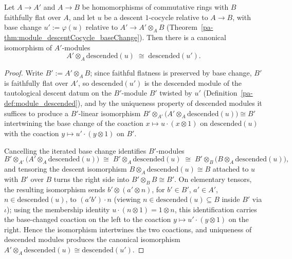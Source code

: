 \begin{theorem}
  \label{pa-thm:module_descendedBaseChangeEquiv}
  \leanok

  Let \(A \to A'\) and \(A \to B\) be homomorphisms of commutative rings with \(B\) faithfully
  flat over \(A\), and let \(u\) be a descent \(1\)-cocycle relative to \(A \to B\), with base
  change \(u' := \varphi(u)\) relative to \(A' \to A' \otimes_A B\)
  (Theorem~\ref{pa-thm:module_descentCocycle_baseChange}). Then there is a canonical isomorphism of
  \(A'\)-modules
  \[
    A' \otimes_A \mathrm{descended}(u) \;\cong\; \mathrm{descended}(u').
  \]
\end{theorem}
\begin{proof}
  \leanok
  Write \(B' := A' \otimes_A B\); since faithful flatness is preserved by base change, \(B'\) is
  faithfully flat over \(A'\), so \(\mathrm{descended}(u')\) is the descended module of the
  tautological descent datum on the \(B'\)-module \(B'\) twisted by \(u'\)
  (Definition~\ref{pa-def:module_descended}), and by the uniqueness property of descended modules
  it suffices to produce a \(B'\)-linear isomorphism
  \(B' \otimes_{A'} \bigl(A' \otimes_A \mathrm{descended}(u)\bigr) \cong B'\) intertwining the
  base change of the coaction \(x \mapsto u \cdot (x \otimes 1)\) on \(\mathrm{descended}(u)\)
  with the coaction \(y \mapsto u' \cdot (y \otimes 1)\) on \(B'\).

  Cancelling the iterated base change identifies \(B'\)-modules
  \[
    B' \otimes_{A'} \bigl(A' \otimes_A \mathrm{descended}(u)\bigr) \;\cong\; B' \otimes_A
    \mathrm{descended}(u) \;\cong\; B' \otimes_B \bigl(B \otimes_A \mathrm{descended}(u)\bigr),
  \]
  and tensoring the descent isomorphism \(B \otimes_A \mathrm{descended}(u) \cong B\) attached to
  \(u\) with \(B'\) over \(B\) turns the right side into \(B' \otimes_B B \cong B'\). On
  elementary tensors, the resulting isomorphism sends \(b' \otimes (a' \otimes n)\), for
  \(b' \in B'\), \(a' \in A'\), \(n \in \mathrm{descended}(u)\), to \((a' b') \cdot n\) (viewing
  \(n \in \mathrm{descended}(u) \subseteq B\) inside \(B'\) via \(\iota\)); using the membership
  identity \(u \cdot (n \otimes 1) = 1 \otimes n\), this identification carries the base-changed
  coaction on the left to the coaction \(y \mapsto u' \cdot (y \otimes 1)\) on the right. Hence
  the isomorphism intertwines the two coactions, and uniqueness of descended modules produces
  the canonical isomorphism \(A' \otimes_A \mathrm{descended}(u) \cong \mathrm{descended}(u')\).
\end{proof}

